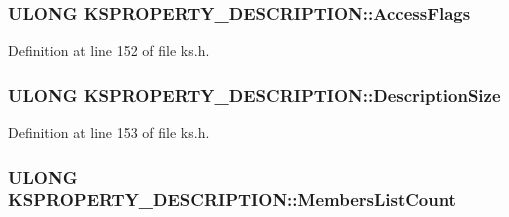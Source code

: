 \subsubsection[{\texorpdfstring{Access\+Flags}{AccessFlags}}]{\setlength{\rightskip}{0pt plus 5cm}U\+L\+O\+NG K\+S\+P\+R\+O\+P\+E\+R\+T\+Y\+\_\+\+D\+E\+S\+C\+R\+I\+P\+T\+I\+O\+N\+::\+Access\+Flags}\hypertarget{struct_k_s_p_r_o_p_e_r_t_y___d_e_s_c_r_i_p_t_i_o_n_a9e931183967a877613638f1cb2b29eb6}{}\label{struct_k_s_p_r_o_p_e_r_t_y___d_e_s_c_r_i_p_t_i_o_n_a9e931183967a877613638f1cb2b29eb6}


Definition at line 152 of file ks.\+h.

\subsubsection[{\texorpdfstring{Description\+Size}{DescriptionSize}}]{\setlength{\rightskip}{0pt plus 5cm}U\+L\+O\+NG K\+S\+P\+R\+O\+P\+E\+R\+T\+Y\+\_\+\+D\+E\+S\+C\+R\+I\+P\+T\+I\+O\+N\+::\+Description\+Size}\hypertarget{struct_k_s_p_r_o_p_e_r_t_y___d_e_s_c_r_i_p_t_i_o_n_a500a1671b6931c3482b811f70ca84398}{}\label{struct_k_s_p_r_o_p_e_r_t_y___d_e_s_c_r_i_p_t_i_o_n_a500a1671b6931c3482b811f70ca84398}


Definition at line 153 of file ks.\+h.

\subsubsection[{\texorpdfstring{Members\+List\+Count}{MembersListCount}}]{\setlength{\rightskip}{0pt plus 5cm}U\+L\+O\+NG K\+S\+P\+R\+O\+P\+E\+R\+T\+Y\+\_\+\+D\+E\+S\+C\+R\+I\+P\+T\+I\+O\+N\+::\+Members\+List\+Count}\hypertarget{struct_k_s_p_r_o_p_e_r_t_y___d_e_s_c_r_i_p_t_i_o_n_a8b8a6e033864e7ce5fe67ce6803c5e13}{}\label{struct_k_s_p_r_o_p_e_r_t_y___d_e_s_c_r_i_p_t_i_o_n_a8b8a6e033864e7ce5fe67ce6803c5e13}


